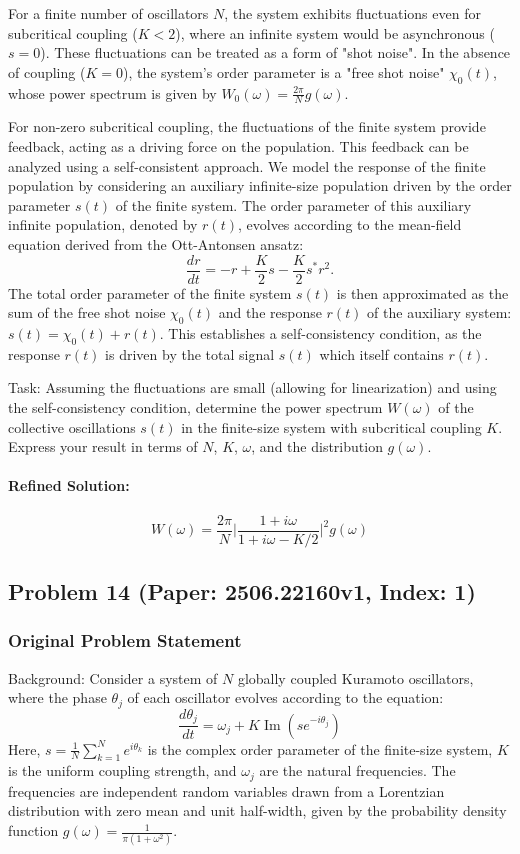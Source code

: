 \documentclass[10pt]{article}
\begin{document}
For a finite number of oscillators $N$, the system exhibits fluctuations even for subcritical coupling ($K<2$), where an infinite system would be asynchronous ($s=0$). These fluctuations can be treated as a form of "shot noise". In the absence of coupling ($K=0$), the system's order parameter is a "free shot noise" $\chi_0(t)$, whose power spectrum is given by $W_0(\omega) = \frac{2\pi}{N}g(\omega)$.

For non-zero subcritical coupling, the fluctuations of the finite system provide feedback, acting as a driving force on the population. This feedback can be analyzed using a self-consistent approach. We model the response of the finite population by considering an auxiliary infinite-size population driven by the order parameter $s(t)$ of the finite system. The order parameter of this auxiliary infinite population, denoted by $r(t)$, evolves according to the mean-field equation derived from the Ott-Antonsen ansatz:
$$ \frac{dr}{dt} = -r + \frac{K}{2}s - \frac{K}{2}s^* r^2. $$
The total order parameter of the finite system $s(t)$ is then approximated as the sum of the free shot noise $\chi_0(t)$ and the response $r(t)$ of the auxiliary system: $s(t) = \chi_0(t) + r(t)$. This establishes a self-consistency condition, as the response $r(t)$ is driven by the total signal $s(t)$ which itself contains $r(t)$.

Task:
Assuming the fluctuations are small (allowing for linearization) and using the self-consistency condition, determine the power spectrum $W(\omega)$ of the collective oscillations $s(t)$ in the finite-size system with subcritical coupling $K$. Express your result in terms of $N$, $K$, $\omega$, and the distribution $g(\omega)$.

\paragraph*{Refined Solution:}
\[ W(\omega)=\frac{2\pi}{N}\bigg|\frac{1+i\omega}{1+i\omega-K/2}\bigg|^2 g(\omega) \]

\newpage
\subsection*{Problem 14 (Paper: 2506.22160v1, Index: 1)}

\subsubsection*{Original Problem Statement}
Background:
Consider a system of $N$ globally coupled Kuramoto oscillators, where the phase $\theta_j$ of each oscillator evolves according to the equation:
$$ \frac{d\theta_j}{dt} = \omega_j + K \operatorname{Im} (s e^{-i\theta_j}) $$
Here, $s = \frac{1}{N} \sum_{k=1}^N e^{i\theta_k}$ is the complex order parameter of the finite-size system, $K$ is the uniform coupling strength, and $\omega_j$ are the natural frequencies. The frequencies are independent random variables drawn from a Lorentzian distribution with zero mean and unit half-width, given by the probability density function $g(\omega) = \frac{1}{\pi(1+\omega^2)}$.
\end{document}
